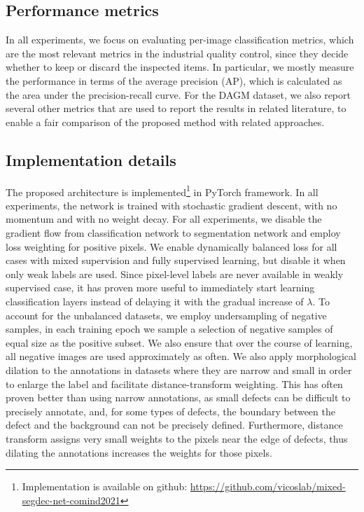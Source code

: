 \subsection{Performance metrics}

In all experiments, we focus on evaluating per-image classification metrics, which are the most relevant metrics in the industrial quality control, since they decide whether to keep or discard the inspected items. In particular, we mostly measure the performance in terms of the average precision (AP), which is calculated as the area under the precision-recall curve. For the DAGM dataset, we also report several other metrics that are used to report the results in related literature, to enable a fair comparison of the proposed method with related approaches.

\subsection{Implementation details}

The proposed architecture is implemented\footnote{Implementation is available on github: \url{https://github.com/vicoslab/mixed-segdec-net-comind2021}} in PyTorch framework. In all experiments, the network is trained with stochastic gradient descent, with no momentum and with no weight decay. 
For all experiments, we disable the gradient flow from classification network to segmentation network and employ loss weighting for positive pixels.
We enable dynamically balanced loss for all cases with mixed supervision and fully supervised learning, but disable it when only weak labels are used. Since pixel-level labels are never available in weakly supervised case, it has proven more useful to immediately start learning classification layers instead of delaying it with the gradual increase of $\lambda$.
To account for the unbalanced datasets, we employ undersampling of negative samples, in each training epoch we sample a selection of negative samples of equal size as the positive subset. 
We also ensure that over the course of learning, all negative images are used approximately as often.
We also apply morphological dilation to the annotations in datasets where they are narrow and small in order to enlarge the label and facilitate distance-transform weighting. This has often proven better than using narrow annotations, as small defects can be difficult to precisely annotate, and, for some types of defects, the boundary between the defect and the background can not be precisely defined. Furthermore, distance transform assigns very small weights to the pixels near the edge of defects, thus dilating the annotations increases the weights for those pixels.

